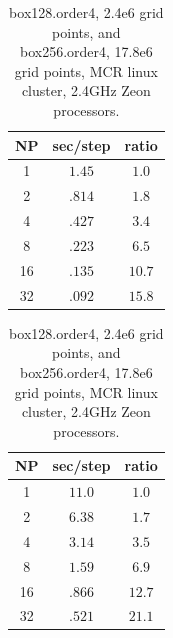 \documentclass[11pt]{article}
\begin{document}
\begin{table}[hbt]
\begin{center}\footnotesize
\begin{tabular}{|c|c|c|} \hline 
     NP       & sec/step   & ratio \\   \hline\hline 
     1        &  $1.45$    & $ 1.0 $   \\ 
     2        &  $.814$    & $ 1.8 $   \\ 
     4        &  $.427$    & $ 3.4 $   \\ 
     8        &  $.223$    & $ 6.5 $   \\ 
    16        &  $.135$    & $10.7 $   \\ 
    32        &  $.092$    & $15.8 $   \\ \hline 
\end{tabular}		
\qquad
\begin{tabular}{|c|c|c|} \hline 
     NP       & sec/step   & ratio \\   \hline\hline 
     1        &  $11.0$    & $ 1.0 $   \\ 
     2        &  $6.38$    & $ 1.7 $   \\ 
     4        &  $3.14$    & $ 3.5 $   \\ 
     8        &  $1.59$    & $ 6.9 $   \\ 
    16        &  $.866$    & $12.7 $   \\ 
    32        &  $.521$    & $21.1 $   \\ \hline 
\end{tabular}	
\end{center}		
\caption{box128.order4, 2.4e6 grid points, and box256.order4, 17.8e6 grid points, MCR linux cluster, 2.4GHz Zeon processors.}
 \label{tab:box} 
\end{table}
\end{document}
